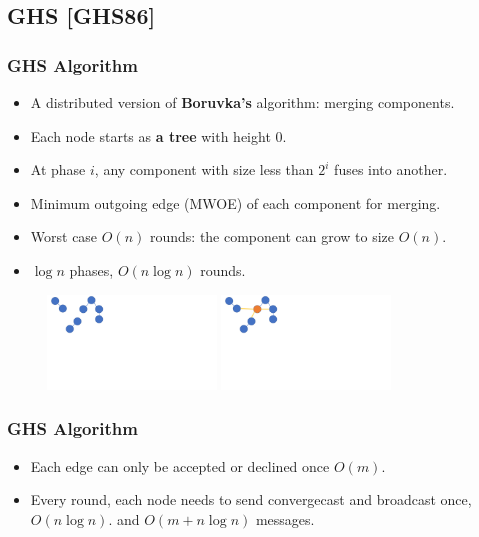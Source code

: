 \subsection{GHS [GHS86]}
\begin{frame}
\frametitle{GHS Algorithm}
\begin{itemize}
    \item A distributed version of \textbf{Boruvka's} algorithm: merging components.
    \item Each node starts as \textbf{a tree} with height 0.
    \item At phase $i$, any component with size less than $2^i$ fuses into another.
    \item Minimum outgoing edge (MWOE) of each component for merging.
    \item Worst case $O(n)$ rounds: the component can grow to size $O(n)$.
    \item $\log n$ phases, $O(n \log n)$ rounds.
\end{itemize}

\begin{figure}
\includegraphics[width=0.4\textwidth,trim={0cm 10cm 18cm 0},clip]{figures/boruv1.pdf}
\includegraphics[width=0.4\textwidth,trim={0cm 10cm 18cm 0},clip]{figures/boruv2.pdf}
\end{figure}
\end{frame}

\begin{frame}
\frametitle{GHS Algorithm}
\begin{itemize}
    \item Each edge can only be accepted or declined once $O(m)$.
    \item Every round, each node needs to send convergecast and broadcast once, $O(n \log n)$.
    and $O(m + n \log n)$ messages.
\end{itemize}
\end{frame}

